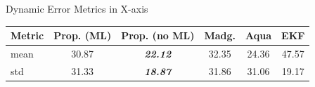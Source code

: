 \documentclass[aspectratio=169,xcolor=dvipsnames]{beamer}
\begin{document}
\begin{frame}{Dynamic Error Metrics in X-axis}
\small
\begin{minipage}{\textwidth}
  \centering
  \scriptsize
  \label{tab:dynamic_x}
  \begin{tabular}{lccccc}
    \toprule
    Metric & Prop. (ML) & Prop. (no ML) & Madg. & Aqua & EKF \\
    \midrule
    mean & 30.87 & \textit{\textbf{22.12}} & 32.35 & 24.36 & 47.57 \\
    std & 31.33 & \textit{\textbf{18.87}} & 31.86 & 31.06 & 19.17 \\
    \bottomrule
  \end{tabular}
\end{minipage}

\vspace{0.5cm}


\end{frame}
\end{document}
